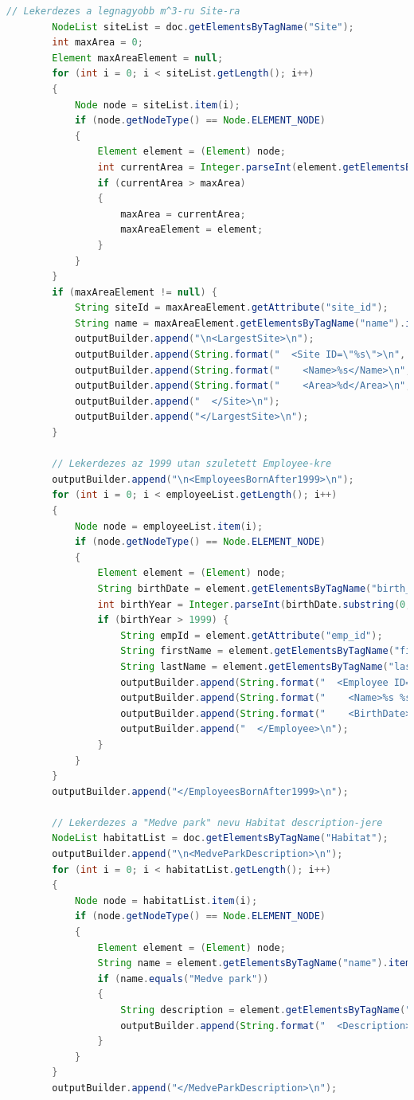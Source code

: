 \documentclass[12pt]{report}
\begin{document}
\begin{lstlisting}[caption={DOMQueryKLNSPG.java} olvasó program, language=Java]
		// Lekerdezes a legnagyobb m^3-ru Site-ra
		NodeList siteList = doc.getElementsByTagName("Site");
		int maxArea = 0;
		Element maxAreaElement = null;
		for (int i = 0; i < siteList.getLength(); i++) 
		{
			Node node = siteList.item(i);
			if (node.getNodeType() == Node.ELEMENT_NODE) 
			{
				Element element = (Element) node;
				int currentArea = Integer.parseInt(element.getElementsByTagName("area").item(0).getTextContent());
				if (currentArea > maxArea) 
				{
					maxArea = currentArea;
					maxAreaElement = element;
				}
			}
		}
		if (maxAreaElement != null) {
			String siteId = maxAreaElement.getAttribute("site_id");
			String name = maxAreaElement.getElementsByTagName("name").item(0).getTextContent();
			outputBuilder.append("\n<LargestSite>\n");
			outputBuilder.append(String.format("  <Site ID=\"%s\">\n", siteId));
			outputBuilder.append(String.format("    <Name>%s</Name>\n", name));
			outputBuilder.append(String.format("    <Area>%d</Area>\n", maxArea));
			outputBuilder.append("  </Site>\n");
			outputBuilder.append("</LargestSite>\n");
		}
		
		// Lekerdezes az 1999 utan szuletett Employee-kre
		outputBuilder.append("\n<EmployeesBornAfter1999>\n");
		for (int i = 0; i < employeeList.getLength(); i++) 
		{
			Node node = employeeList.item(i);
			if (node.getNodeType() == Node.ELEMENT_NODE) 
			{
				Element element = (Element) node;
				String birthDate = element.getElementsByTagName("birth_date").item(0).getTextContent();
				int birthYear = Integer.parseInt(birthDate.substring(0, 4));
				if (birthYear > 1999) {
					String empId = element.getAttribute("emp_id");
					String firstName = element.getElementsByTagName("first_name").item(0).getTextContent();
					String lastName = element.getElementsByTagName("last_name").item(0).getTextContent();
					outputBuilder.append(String.format("  <Employee ID=\"%s\">\n", empId));
					outputBuilder.append(String.format("    <Name>%s %s</Name>\n", firstName, lastName));
					outputBuilder.append(String.format("    <BirthDate>%s</BirthDate>\n", birthDate));
					outputBuilder.append("  </Employee>\n");
				}
			}
		}
		outputBuilder.append("</EmployeesBornAfter1999>\n");
		
		// Lekerdezes a "Medve park" nevu Habitat description-jere
		NodeList habitatList = doc.getElementsByTagName("Habitat");
		outputBuilder.append("\n<MedveParkDescription>\n");
		for (int i = 0; i < habitatList.getLength(); i++) 
		{
			Node node = habitatList.item(i);
			if (node.getNodeType() == Node.ELEMENT_NODE) 
			{
				Element element = (Element) node;
				String name = element.getElementsByTagName("name").item(0).getTextContent();
				if (name.equals("Medve park")) 
				{
					String description = element.getElementsByTagName("description").item(0).getTextContent();
					outputBuilder.append(String.format("  <Description>%s</Description>\n", description));
				}
			}
		}
		outputBuilder.append("</MedveParkDescription>\n");
		

\end{lstlisting}
\end{document}
